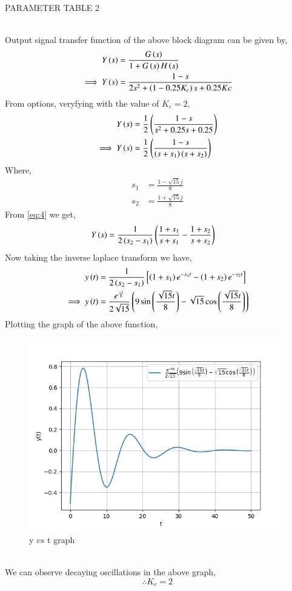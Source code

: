 \documentclass[journal,12pt,twocolumn]{IEEEtran}
\theoremstyle{remark}
\begin{document}
\begin{table}[ht]
    \centering
    
    \caption{PARAMETER TABLE 2}
    \label{tab:ch.45.2}
\end{table} \\
Output signal transfer function of the above block diagram can be given by,
\begin{align}
     Y\left(s\right) &= \frac{G\left(s\right)}{1+G\left(s\right)H\left(s\right)}    \\
    \implies Y\left(s\right) &= \frac{1-s}{2s^2 + \left(1-0.25K_c\right)s + 0.25Kc}
\end{align}
From options, veryfying with the value of $K_c=2$, 
\begin{align}
    Y\left(s\right) &= \frac{1}{2}\left(\frac{1-s}{s^2+0.25s+0.25}\right)   \\
    \implies Y\left(s\right) &= \frac{1}{2}\left(\frac{1-s}{\left(s+s_1\right)\left(s+s_2\right)}\right) \label{eq:4}
\end{align}
Where,
\begin{align}
    s_1 &= \frac{1-\sqrt{15}j}{8}   \\
    s_2 &= \frac{1+\sqrt{15}j}{8}   
\end{align}
From \eqref{eq:4} we get,
\begin{align}
    Y\left(s\right) &= \frac{1}{2\left(s_2-s_1\right)}\left(\frac{1+s_1}{s+s_1}-\frac{1+s_2}{s+s_2}\right)
\end{align}
Now taking the inverse laplace transform we have,
\begin{align}
    y\left(t\right) &= \frac{1}{2\left(s_2-s_1\right)} \left [\left(1+s_1\right)e^{-s_1t}-\left(1+s_2\right)e^{-s_2t} \right ]  \\
    \implies y\left(t\right) &= \frac{e^{\frac{-t}{8}}}{2\sqrt{15}}\left(9\sin \left(\frac{\sqrt{15}t}{8}\right) - \sqrt{15}\cos \left(\frac{\sqrt{15}t}{8}\right)\right)
\end{align}
Plotting the graph of the above function,   \\
\begin{figure}[ht]
    \centering
    \includegraphics[width=\columnwidth]{figs/b.png}
    \caption{y $vs$ t graph}
    \label{fig:ch.45.2}
\end{figure}    \\
We can observe decaying oscillations in the above graph,    \\
$$\therefore K_c=2$$
\end{document}
